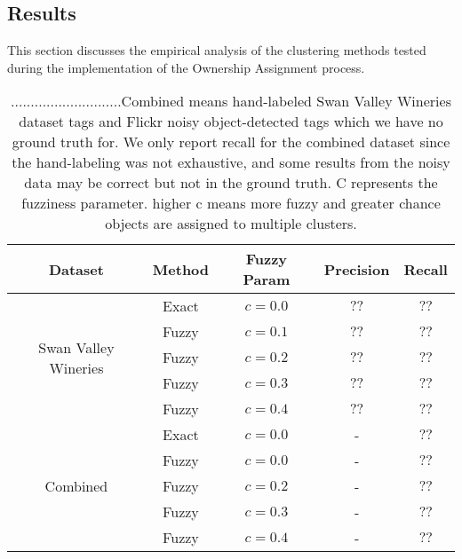 \subsection{Results} \label{subsection:own_results}
This section discusses the empirical analysis of the clustering methods tested during the implementation of the Ownership Assignment process. 

\begin{table}[h!]
	\begin{center}
		\begin{tabular}{ |c|c|c|c|c| } 
			\hline
			Dataset & Method & Fuzzy Param & Precision & Recall \\
			\hline
			\multirow{5}{9em}{Swan Valley Wineries } 
                & Exact & $c = 0.0$ & $??$ & $??$  \\ 
			& Fuzzy & $c = 0.1$ & $??$ & $??$  \\ 
			& Fuzzy & $c = 0.2$ & $??$ & $??$  \\
			& Fuzzy & $c = 0.3$ & $??$ & $??$  \\ 
			& Fuzzy & $c = 0.4$ & $??$ & $??$  \\ 
			\multirow{5}{9em}{Combined} 
                & Exact & $c = 0.0$ & - & $??$  \\ 
			& Fuzzy & $c = 0.0$ & - & $??$  \\ 
			& Fuzzy & $c = 0.2$ & - & $??$  \\ 
			& Fuzzy & $c = 0.3$ & - & $??$  \\ 
			& Fuzzy & $c = 0.4$ & - & $??$  \\ 

			\hline
		\end{tabular}
		\label{table:clustering}
		\caption{............................Combined means hand-labeled Swan Valley Wineries dataset tags and Flickr noisy object-detected tags which we have no ground truth for. We only report recall for the combined dataset since the hand-labeling was not exhaustive, and some results from the noisy data may be correct but not in the ground truth. C represents the fuzziness parameter. higher c means more fuzzy and greater chance objects are assigned to multiple clusters.}
	\end{center}
\end{table}



